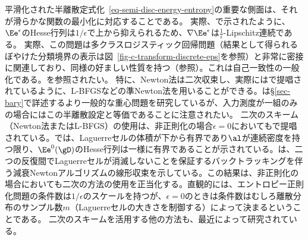 \begin{rem}[二次の方法とロジスティック回帰との関連]\label{rem-second-order-smoothness}
	平滑化された半離散定式化~\eqref{eq-semi-disc-energy-entropy}の重要な側面は、それが滑らかな関数の最小化に対応することである。
	実際、\citep{genevay2016stochastic}で示されたように、$\Ee^\epsilon$のHesse行列は$1/\epsilon$で上から抑えられるため、$\nabla \Ee^\epsilon$は$\frac{1}{\epsilon}$-Lipschitz連続である。
	実際、この問題は多クラスロジスティック回帰問題（結果として得られるぼやけた分類境界の表示は図~\ref{fig-c-transform-discrete-eps}を参照）と非常に密接に関連しており、同様の好ましい性質を持つ（\citep{hosmer2013applied}参照）。これは自己一致性の一般化である。\citep{bach2010self}を参照されたい。
	特に、Newton法は二次収束し、実際には\citep{2016-Cuturi-siims}で提唱されているように、L-BFGSなどの準Newton法を用いることができる。\citep{2016-Cuturi-siims}は\S\ref{sec-bary}で詳述するより一般的な重心問題を研究しているが、入力測度が一組のみの場合にはこの半離散設定と等価であることに注意されたい。
	二次のスキーム（Newton法またはL-BFGS）の使用は、非正則化の場合$\epsilon=0$においても\citep{Merigot11,de2012blue,levy2015numerical}で提唱されている。\citep[Theo. 5.1]{kitagawa2016newton}では、Laguerreセルの体積が下から有界であり$\al$が連続密度を持つ限り、$\Ee^0(\gD)$のHesse行列は一様に有界であることが示されている。\citeauthor{kitagawa2016newton}は、二つの反復間でLaguerreセルが消滅しないことを保証するバックトラッキングを伴う減衰Newtonアルゴリズムの線形収束を示している。この結果は、非正則化の場合においても二次の方法の使用を正当化する。直観的には、エントロピー正則化問題の条件数は$1/\epsilon$のスケールを持つが、$\epsilon=0$のときは条件数はむしろ離散分布のサンプル数$m$（Laguerreセルの大きさを制御する）によって決まるということである。
	二次のスキームを活用する他の方法も、最近\citep{knight2013fast,sugiyama2017tensor,cohen2017matrix,allen2017much}によって研究されている。
\end{rem}




